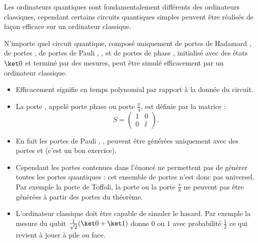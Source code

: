 \documentclass[11pt,class=report,crop=false]{standalone}
\begin{document}

Les ordinateurs quantiques sont fondamentalement différents des ordinateurs classiques, cependant certains circuits quantiques simples peuvent être réalisés de façon efficace sur un ordinateur classique.

\begin{theoreme}
N'importe quel circuit quantique, composé uniquement de portes 
de Hadamard , de portes , de portes de Pauli , ,  et de portes de phase , initialisé avec des états $\ket0$ et terminé par des mesures, peut être simulé efficacement par un ordinateur classique.
\end{theoreme}

\bigskip

\begin{itemize}
  \item \og{}Efficacement\fg{} signifie en temps polynomial par rapport à la donnée du circuit.

  \item La porte , appelé \og{}porte phase\fg{} ou \og{}porte $\frac\pi4$\fg{}, est définie par la matrice :
$$S = \begin{pmatrix}1&0\\0&\ii\end{pmatrix}.$$

  \item En fait les portes de Pauli , ,  peuvent être générées uniquement avec des portes  et  (c'est un bon exercice).

  \item Cependant les portes contenues dans l'énoncé ne permettent pas de générer toutes les portes quantiques : cet ensemble de portes n'est donc pas universel. Par exemple la porte de Toffoli, la porte  ou la porte $\frac\pi8$ ne peuvent pas être générées à partir des portes du théorème. 

  \item L'ordinateur classique doit être capable de simuler le hasard. Par exemple la mesure du qubit $\frac1{\sqrt2}(\ket0+\ket1)$ donne $0$ ou $1$ avec probabilité $\frac12$ ce qui revient à jouer à pile ou face.
\end{itemize}
\end{document}
